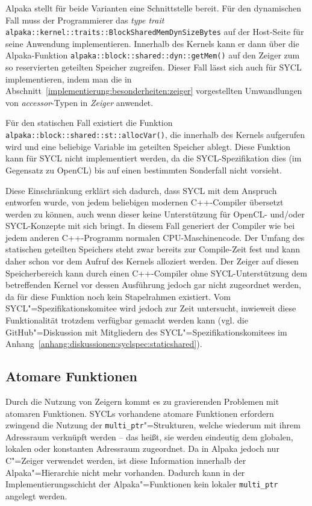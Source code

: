 Alpaka stellt für beide Varianten eine Schnittstelle bereit. Für den dynamischen
Fall muss der Programmierer das \textit{type trait}
\texttt{alpaka::kernel::traits::BlockSharedMemDynSizeBytes} auf der Host-Seite
für seine Anwendung implementieren. Innerhalb des Kernels kann er dann über die
Alpaka-Funktion \texttt{alpaka::block::shared::dyn::getMem()} auf den Zeiger
zum so reservierten geteilten Speicher zugreifen. Dieser Fall lässt sich auch
für SYCL implementieren, indem man die in
Abschnitt~\ref{implementierung:besonderheiten:zeiger} vorgestellten
Umwandlungen von \textit{accessor}-Typen in \textit{Zeiger} anwendet.

Für den statischen Fall existiert die Funktion
\texttt{alpaka::block::shared::st::allocVar()}, die innerhalb des Kernels
aufgerufen wird und eine beliebige Variable im geteilten Speicher ablegt. Diese
Funktion kann für SYCL nicht implementiert werden, da die SYCL-Spezifikation
dies (im Gegensatz zu OpenCL) bis auf einen bestimmten Sonderfall
\cite[siehe][Abschnitt 4.8.5.3]{sycl2019} nicht vorsieht.

Diese Einschränkung erklärt sich dadurch, dass SYCL mit dem Anspruch entworfen
wurde, von jedem beliebigen modernen C++-Compiler übersetzt werden zu können,
auch wenn dieser keine Unterstützung für OpenCL- und/oder SYCL-Konzepte mit sich
bringt. In diesem Fall generiert der Compiler wie bei jedem anderen C++-Programm
normalen CPU-Maschinencode. Der Umfang des statischen geteilten Speichers steht
zwar bereits zur Compile-Zeit fest und kann daher schon vor dem Aufruf des
Kernels alloziert werden. Der Zeiger auf diesen Speicherbereich kann durch einen
C++-Compiler ohne SYCL-Unterstützung dem betreffenden Kernel vor dessen
Ausführung jedoch gar nicht zugeordnet werden, da für diese Funktion noch kein
Stapelrahmen existiert. Vom SYCL"=Spezifikationskomitee wird jedoch zur Zeit
untersucht, inwieweit diese Funktionalität trotzdem verfügbar gemacht werden
kann (vgl. die GitHub"=Diskussion mit Mitgliedern des
SYCL"=Spezifikationskomitees im
Anhang~\ref{anhang:diskussionen:syclspec:staticshared}).

\subsection{Atomare Funktionen}\label{implementierung:probleme:atomics}

Durch die Nutzung von Zeigern kommt es zu gravierenden Problemen mit atomaren
Funktionen. SYCLs vorhandene atomare Funktionen erfordern zwingend die Nutzung
der \texttt{multi\_ptr}"=Strukturen, welche wiederum mit ihrem Adressraum
verknüpft werden -- das heißt, sie werden eindeutig dem globalen, lokalen oder
konstanten Adressraum zugeordnet. Da in Alpaka jedoch nur C"=Zeiger
verwendet werden, ist diese Information innerhalb der Alpaka"=Hierarchie nicht
mehr vorhanden. Dadurch kann in der Implementierungsschicht der
Alpaka"=Funktionen kein lokaler \texttt{multi\_ptr} angelegt werden.

